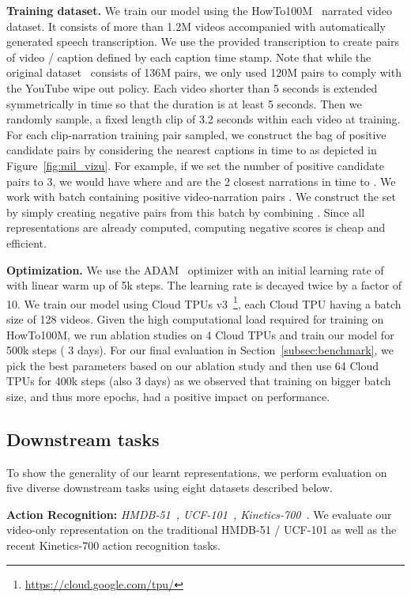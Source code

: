 \documentclass[10pt,twocolumn,letterpaper]{article}
\begin{document}
\noindent
\textbf{Training dataset.}
We train our model using the HowTo100M~\cite{miech19howto100m} narrated video dataset.
It consists of more than 1.2M videos accompanied with automatically generated speech transcription.
We use the provided transcription to create pairs of video / caption defined by each caption time stamp.
Note that while the original dataset~\cite{miech19howto100m} consists of 136M pairs, we only used 120M pairs to comply with the YouTube wipe out policy.
Each video shorter than 5 seconds is extended symmetrically in time so that the duration is at least 5 seconds.
Then we randomly sample, a fixed length clip of 3.2 seconds within each video at training.
For each clip-narration training pair  sampled, we construct the bag of positive candidate pairs  by considering the nearest captions in time to  as depicted in Figure~\ref{fig:mil_vizu}.
For example, if we set the number of positive candidate pairs to 3, we would have  where  and  are the 2 closest narrations in time to .
We work with batch containing  positive video-narration pairs  .
We construct the set  by simply creating negative pairs from this batch by combining .
Since all representations are already computed, computing negative scores is cheap and efficient.

\noindent
\textbf{Optimization.}
We use the ADAM~\cite{kingma15adam} optimizer with an initial learning rate of  with linear warm up of 5k steps.
The learning rate is decayed twice by a factor of 10.
We train our model using Cloud TPUs v3~\footnote{\url{https://cloud.google.com/tpu/}}, each Cloud TPU having a batch size of 128 videos.
Given the high computational load required for training on HowTo100M, we run ablation studies on 4 Cloud TPUs and train our model for 500k steps ( 3 days). 
For our final evaluation in Section~\ref{subsec:benchmark}, we pick the best parameters based on our ablation study and then use 64 Cloud TPUs for 400k steps (also  3 days) as we observed that training on bigger batch size, and thus more epochs, had a positive impact on performance.

\subsection{Downstream tasks}
\label{subsec:tasks}
To show the generality of our learnt representations, 
we perform evaluation on five diverse downstream tasks using eight datasets described below.

\noindent
\textbf{Action Recognition:} \textit{HMDB-51~\cite{kuehne2011hmdb}, UCF-101~\cite{soomro2012}, Kinetics-700~\cite{carreira2019short}}.
We evaluate our video-only representation on the traditional HMDB-51 / UCF-101 as well as the recent Kinetics-700 action recognition tasks.
\end{document}
